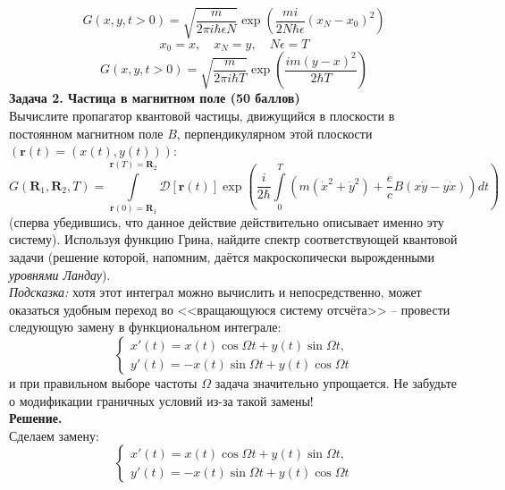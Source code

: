 \documentclass[12pt]{article}
\theoremstyle{definition}
\begin{document}
\begin{equation}
    G(x,y,t>0)=\sqrt{\frac{m}{2\pi i\hbar\epsilon N}}\exp\left(\frac{mi}{2N\hbar\epsilon}(x_N-x_0)^2\right)
\end{equation}
\begin{equation}
    x_0=x,\quad x_N=y,\quad N\epsilon=T
\end{equation}
\begin{equation}
    \boxed{G(x,y,t>0)=\sqrt{\frac{m}{2\pi i\hbar T}}\exp\left(\frac{im(y-x)^2}{2\hbar T}\right)}
\end{equation}
\textbf{Задача 2. Частица в магнитном поле (50 баллов)}\\
Вычислите пропагатор квантовой частицы, движущийся в плоскости в постоянном магнитном поле $B$, перпендикулярном этой плоскости $(\textbf{r}(t) = (x(t), y(t)))$:
\begin{equation}
    G(\textbf{R}_1,\textbf{R}_2,T)=\int\limits_{\textbf{r}(0)=\textbf{R}_1}^{\textbf{r}(T)=\textbf{R}_2}\mathcal{D}[\textbf{r}(t)]\exp\left(\frac{i}{2\hbar}\int\limits_0^T\left(m(\dot{x}^2+\dot{y}^2)+\frac{e}{c}B(x\dot{y}-y\dot{x})\right)dt\right)
\end{equation}
(сперва убедившись, что данное действие действительно описывает именно эту систему). Используя функцию Грина, найдите спектр соответствующей квантовой задачи (решение которой, напомним, даётся макроскопически вырожденными \textit{уровнями Ландау}).\\
\textit{Подсказка:} хотя этот интеграл можно вычислить и непосредственно, может оказаться удобным переход во <<вращающуюся систему отсчёта>> -- провести следующую замену в функциональном интеграле:
\begin{equation}
    \begin{cases}
        x'(t)=x(t)\cos\Omega t+y(t)\sin\Omega t,\\
        y'(t)=-x(t)\sin\Omega t+y(t)\cos\Omega t
    \end{cases}
\end{equation}
и при правильном выборе частоты $\Omega$ задача значительно упрощается. Не забудьте о модификации граничных условий из-за такой замены!\\
\textbf{Решение.}\\
Сделаем замену:
\begin{equation}
    \begin{cases}
        x'(t)=x(t)\cos\Omega t+y(t)\sin\Omega t,\\
        y'(t)=-x(t)\sin\Omega t+y(t)\cos\Omega t
    \end{cases}
\end{equation}
\end{document}
